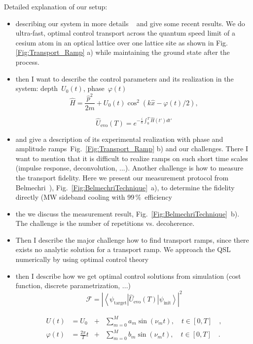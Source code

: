 \documentclass[aps,pra,reprint,a4paper,nofootinbib,superscriptaddress,numbers,longbibliography,showpacs,showkeys,floatfix]{revtex4-1}
\def\bra#1{\left\langle#1\right|}
\def\ket#1{\left|#1\right\rangle}
\begin{document}
Detailed explanation of our setup:
\begin{itemize}
    \item describing our system in more details ~\cite{Karski:2009a} and give some recent results. We do  ultra-fast, optimal control transport across the quantum speed limit of a cesium atom in an optical lattice over one lattice site as shown in Fig. \ref{Fig:Transport_Ramp} a) while maintaining the ground state after the process.
    \item then I want to describe the control parameters and its realization in the system: depth~$U_0(t)$, phase~$\varphi(t)$
        \begin{equation}
        \hat{H}  = \frac{\hat{p}^2}{2m} + U_0(t) \cos^2(k\hat{x} - \varphi(t)/2), 
        \label{eq:Hamiltonian}
        \end{equation}
        
        \begin{equation}
        \hat{U}_{\text{evo}}(T) =  e^{- \frac{i}{\hbar} \int_{0}^{T} \! \hat{H}(t') dt'}
        \end{equation} 
    \item and give a description of its experimental realization with phase and amplitude ramps~Fig.~\ref{Fig:Transport_Ramp} b) and our challenges. There I want to mention that it is difficult to realize ramps on such short time scales (impulse response, deconvolution, ...). Another challenge is how to measure the transport fidelity. Here we present our measurement protocol from Belmechri~\cite{Belmechri:2013}), Fig.~\ref{Fig:BelmechriTechnique}~a), to determine the fidelity directly (MW sideband cooling with 99$\,\%$~efficiency~\cite{Robens:2018}
    \item the we discuss the measurement result, Fig.~\ref{Fig:BelmechriTechnique}~b). The challenge is the number of repetitions vs. decoherence. 
    \item Then I describe the major challenge how to find transport ramps, since there exists no analytic solution for a transport ramp. We approach the QSL numerically by using optimal control theory \cite{Treutlein:2006, Buecker:2011, Rosi:2013}
    \item then I describe how we get optimal control solutions from simulation (cost function, discrete parametrization, ...) 
        \begin{equation}
        \mathcal{F} = |\bra{\psi_{\text{target}}} \hat{U}_{\text{evo}}(T) \ket{\psi_{\text{init}}} |^2
        \end{equation}
        
        \begin{equation}
        \begin{aligned}
        U(t)       & = U_0 & + & \sum_{m=0}^{M} a_m \sin(\nu_m t) , \quad t \in [0,T]\quad,\\
        \varphi(t) & = \frac{2 \pi}{T} t & + & \sum_{m=0}^{M} b_m \sin(\nu_m t) , \quad t \in [0,T]\quad.
        \end{aligned}
        \label{Fourier_Series}
        \end{equation}
\end{itemize}
\end{document}
